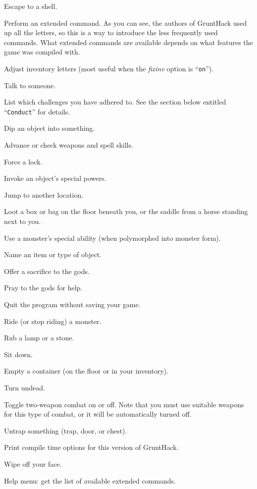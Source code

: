 Escape to a shell.
\item[\tb{\#}]
Perform an extended command.  As you can see, the authors of GruntHack
used up all the letters, so this is a way to introduce the less frequently
used commands.
What extended commands are available depends on what features the game was
compiled with.
\item[\tb{\#adjust}]
Adjust inventory letters (most useful when the
{\it fixinv }
option is ``{\tt on}'').
\item[\tb{\#chat}]
Talk to someone.
\item[\tb{\#conduct}]
List which challenges you have adhered to.  See the section below entitled
``{\tt Conduct}'' for details.
\item[\tb{\#dip}]
Dip an object into something.
\item[\tb{\#enhance}]
Advance or check weapons and spell skills.
\item[\tb{\#force}]
Force a lock.
\item[\tb{\#invoke}]
Invoke an object's special powers.
\item[\tb{\#jump}]
Jump to another location.
\item[\tb{\#loot}]
Loot a box or bag on the floor beneath you, or the saddle 
from a horse standing next to you.
\item[\tb{\#monster}]
Use a monster's special ability (when polymorphed into monster form).
\item[\tb{\#name}]
Name an item or type of object.
\item[\tb{\#offer}]
Offer a sacrifice to the gods.
\item[\tb{\#pray}]
Pray to the gods for help.
\item[\tb{\#quit}]
Quit the program without saving your game.
\item[\tb{\#ride}]
Ride (or stop riding) a monster.
\item[\tb{\#rub}]
Rub a lamp or a stone.
\item[\tb{\#sit}]
Sit down.
\item[\tb{\#tip}]
Empty a container (on the floor or in your inventory).
\item[\tb{\#turn}]
Turn undead.
\item[\tb{\#twoweapon}]
Toggle two-weapon combat on or off.  Note that you must
use suitable weapons for this type of combat, or it will
be automatically turned off.
\item[\tb{\#untrap}]
Untrap something (trap, door, or chest).
\item[\tb{\#version}]
Print compile time options for this version of GruntHack.
\item[\tb{\#wipe}]
Wipe off your face.
\item[\tb{\#?}]
Help menu:  get the list of available extended commands.

